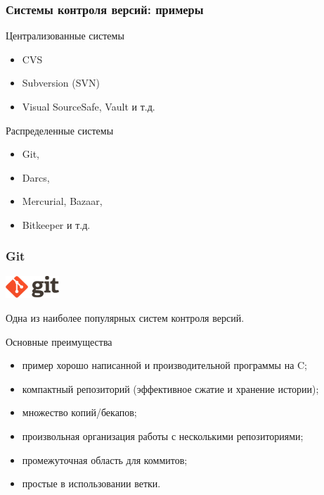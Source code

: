 \documentclass{beamer}
\begin{document}
\begin{frame}
  \frametitle{Системы контроля версий: примеры}
  \begin{block}{Централизованные системы}
    \begin{itemize}
      \item CVS
      \item Subversion (SVN)
      \item Visual SourceSafe, Vault и т.д.
    \end{itemize}
  \end{block}

  \begin{block}{Распределенные системы}
    \begin{itemize}
      \item Git,
      \item Darcs,
      \item Mercurial, Bazaar,
      \item Bitkeeper и т.д.
    \end{itemize}
  \end{block}
\end{frame}

\begin{frame}
  \frametitle{Git}
  
  \includegraphics[width=2cm]{images/git-logo.png}

  Одна из наиболее популярных систем контроля версий.

  \begin{block}{Основные преимущества}
    \begin{itemize}
      \item пример хорошо написанной и производительной программы на C;
      \item компактный репозиторий (эффективное сжатие и хранение истории);
      \item множество копий/бекапов;
      \item произвольная организация работы с несколькими репозиториями;
      \item промежуточная область для коммитов;
      \item простые в использовании ветки.
    \end{itemize}
  \end{block}
\end{frame}
\end{document}
